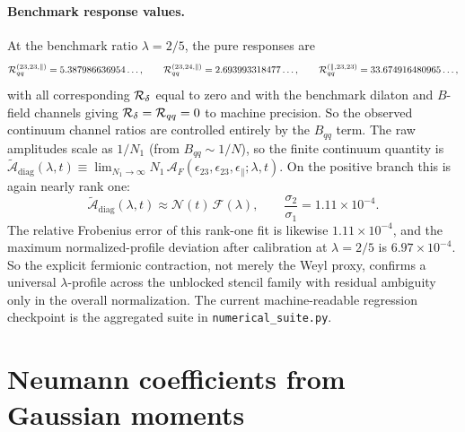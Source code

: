 \documentclass[11pt]{article}
\begin{document}
\paragraph{Benchmark response values.}
At the benchmark ratio $\lambda = 2/5$, the pure responses are
\begin{equation}
{\cal R}^{(23,23,\parallel)}_{qq} = 5.387986636954\ldots,
\qquad
{\cal R}^{(23,24,\parallel)}_{qq} = 2.693993318477\ldots,
\qquad
{\cal R}^{(\parallel,23,23)}_{qq} = 33.674916480965\ldots,
\label{eq:ferm-response-benchmark}
\end{equation}
with all corresponding ${\cal R}_\delta$ equal to zero and with the benchmark dilaton and $B$-field channels giving ${\cal R}_\delta = {\cal R}_{qq} = 0$ to machine precision. So the observed continuum channel ratios are controlled entirely by the $B_{qq}$ term. The raw amplitudes scale as $1/N_1$ (from $B_{qq} \sim 1/N$), so the finite continuum quantity is $\widetilde{\mathcal{A}}_{\mathrm{diag}}(\lambda, t) \equiv \lim_{N_1 \to \infty}N_1\,\mathcal{A}_F(\epsilon_{23}, \epsilon_{23}, \epsilon_\parallel;\lambda, t)$. On the positive branch this is again nearly rank one:
\begin{equation}
\widetilde{\mathcal{A}}_{\mathrm{diag}}(\lambda, t) \approx \mathcal{N}(t)\,\mathcal{F}(\lambda),
\qquad
\frac{\sigma_2}{\sigma_1} = 1.11 \times 10^{-4}.
\label{eq:ferm-rank1}
\end{equation}
The relative Frobenius error of this rank-one fit is likewise $1.11\times 10^{-4}$, and the maximum normalized-profile deviation after calibration at $\lambda = 2/5$ is $6.97\times 10^{-4}$. So the explicit fermionic contraction, not merely the Weyl proxy, confirms a universal $\lambda$-profile across the unblocked stencil family with residual ambiguity only in the overall normalization. The current machine-readable regression checkpoint is the aggregated suite in \texttt{numerical\_suite.py}.

\section{Neumann coefficients from Gaussian moments}
\label{sec:neumann}
\end{document}
